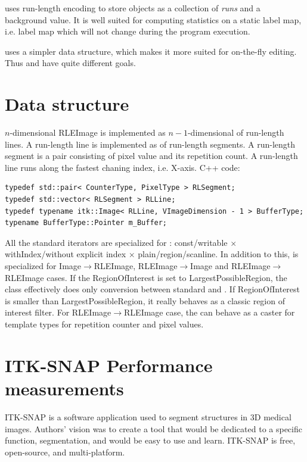 \documentclass{InsightArticle}
\begin{document}
\cite{Lehmann2007} uses run-length encoding to store objects
as a collection of \textit{runs} and a background value.
It is well suited for computing statistics on a static label map,
i.e. label map which will not change during the program execution.

 uses a simpler data structure, which makes it more suited
for on-the-fly editing.
Thus  and  have quite different goals.


\section{Data structure}

$n$-dimensional RLEImage is implemented as $n-1$-dimensional  of run-length lines.
A run-length line is implemented as  of run-length segments.
A run-length segment is a pair consisting of pixel value and its repetition count.
A run-length line runs along the fastest chaning index, i.e. X-axis. C++ code:

\begin{verbatim}
typedef std::pair< CounterType, PixelType > RLSegment;
typedef std::vector< RLSegment > RLLine;
typedef typename itk::Image< RLLine, VImageDimension - 1 > BufferType;
typename BufferType::Pointer m_Buffer;
\end{verbatim}

All the standard iterators are specialized for :
const/writable $\times$ withIndex/without explicit index $\times$ plain/region/scanline.
In addition to this,  is specialized for
Image$\rightarrow$RLEImage, RLEImage$\rightarrow$Image and RLEImage$\rightarrow$RLEImage cases.
If the RegionOfInterest is set to LargestPossibleRegion, the class effectively
does only conversion between standard  and .
If RegionOfInterest is smaller than LargestPossibleRegion,
it really behaves as a classic region of interest filter.
For RLEImage$\rightarrow$RLEImage case, the 
can behave as a caster for template types for repetition counter and pixel values.

\section{ITK-SNAP Performance measurements}

ITK-SNAP is a software application used to segment structures in 3D medical images.
Authors' vision was to create a tool that would be dedicated to a specific function,
segmentation, and would be easy to use and learn.
ITK-SNAP is free, open-source, and multi-platform.
\end{document}
